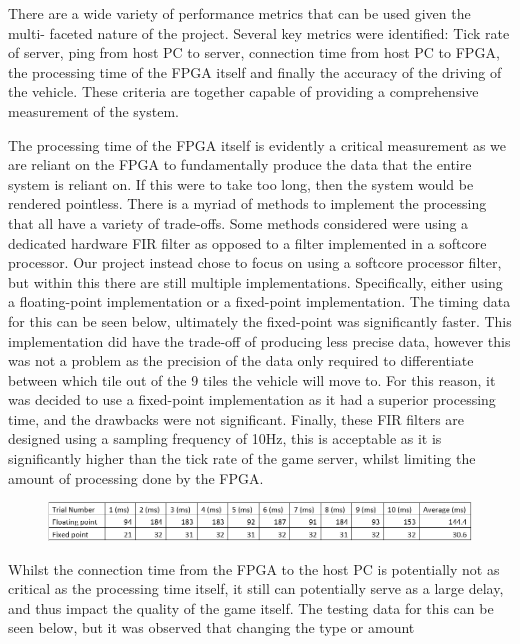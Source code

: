 \documentclass[12pt,a4paper]{article}
\begin{document}
{\scriptsize There are a wide variety of performance metrics that can be used given the multi-
faceted nature of the project. Several key metrics were identified: Tick rate of 
server, ping from host PC to server, connection time from host PC to FPGA, the 
processing time of the FPGA itself and finally the accuracy of the driving of 
the vehicle. These criteria are together capable of providing a comprehensive 
measurement of the system. 
\par
The processing time of the FPGA itself is evidently a critical measurement as we 
are reliant on the FPGA to fundamentally produce the data that the entire system 
is reliant on. If this were to take too long, then the system would be rendered 
pointless. There is a myriad of methods to implement the processing that all have 
a variety of trade-offs. Some methods considered were using a dedicated hardware 
FIR filter as opposed to a filter implemented in a softcore processor. Our project 
instead chose to focus on using a softcore processor filter, but within this there 
are still multiple implementations. Specifically, either using a floating-point 
implementation or a fixed-point implementation. The timing data for this can be 
seen below, ultimately the fixed-point was significantly faster. This implementation
 did have the trade-off of producing less precise data, however this was not a 
 problem as the precision of the data only required to differentiate between which 
 tile out of the 9 tiles the vehicle will move to. For this reason, it was decided 
 to use a fixed-point implementation as it had a superior processing time, and the 
 drawbacks were not significant. Finally, these FIR filters are designed using a 
 sampling frequency of 10Hz, this is acceptable as it is significantly higher than 
 the tick rate of the game server, whilst limiting the amount of processing done by 
 the FPGA.
 \par
 \begin{figure} [h!]
    \centering
    \includegraphics[scale = 0.5]{Point.png}
 \end{figure}
 \par
 Whilst the connection time from the FPGA to the host PC is potentially not as 
 critical as the processing time itself, it still can potentially serve as a 
 large delay, and thus impact the quality of the game itself. The testing data 
 for this can be seen below, but it was observed that changing the type or amount 
}
\end{document}
